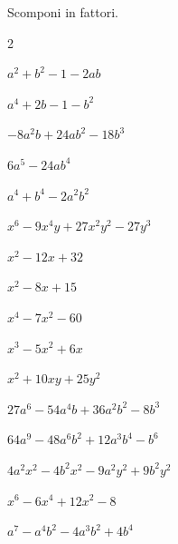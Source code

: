 \begin{esercizio}
Scomponi in fattori.
\begin{htmulticols}{2}
\begin{enumeratea}
\item \(a^{2}+b^{2}-1-2{ab}\)
\item \(a^{4}+2b-1-b^{2}\)
\item \(-8a^{2}b+24{ab}^{2}-18b^{3}\)
\item \(6a^{5}-24{ab}^{4}\)
\item \(a^{4}+b^{4}-2a^{2}b^{2}\)
\item \(x^{6}-9x^{4}y+27x^{2}y^{2}-27y^{3}\)
\item \(x^{2}-12x+32\)
\item \(x^{2}-8x+15\)
\item \(x^{4}-7x^{2}-60\)
\item \(x^{3}-5x^{2}+6x\)
\item \(x^{2}+10xy+25y^{2}\)
\item \(27a^{6}-54a^{4}b+36a^{2}b^{2}-8b^{3}\)
\item \(64a^{9}-48a^{6}b^{2}+12a^{3}b^{4}-b^{6}\)
\item \(4a^{2}x^{2}-4b^{2}x^{2}-9a^{2}y^{2}+9b^{2}y^{2}\)
\item \(x^{6}-6x^{4}+12x^{2}-8\)
\item \(a^{7}-a^{4}b^{2}-4a^{3}b^{2}+4b^{4}\)
\end{enumeratea}
\end{htmulticols}
\end{esercizio}


